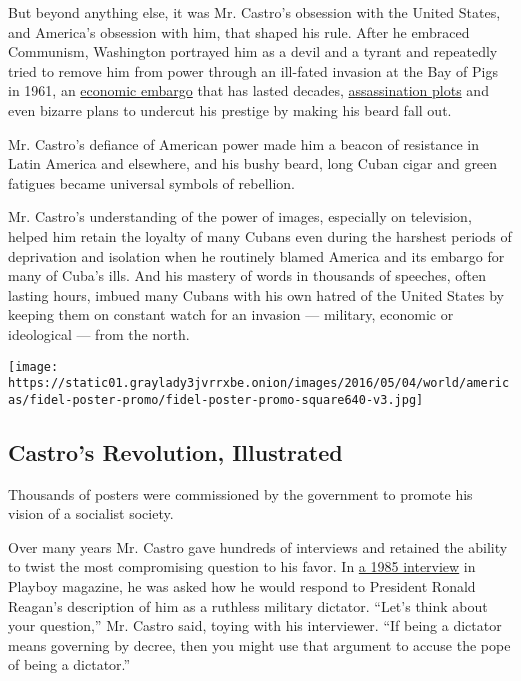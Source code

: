 But beyond anything else, it was Mr. Castro's obsession with the United
States, and America's obsession with him, that shaped his rule. After he
embraced Communism, Washington portrayed him as a devil and a tyrant and
repeatedly tried to remove him from power through an ill-fated invasion
at the Bay of Pigs in 1961, an
\href{http://www.treasury.gov/resource-center/sanctions/Programs/Pages/cuba.aspx}{economic
embargo} that has lasted decades,
\href{http://washington.blogs.nytimes3xbfgragh.onion/2007/06/26/a-plot-to-assassinate-castro-was-approved-by-cia-director-allen-dulles/}{assassination
plots} and even bizarre plans to undercut his prestige by making his
beard fall out.

Mr. Castro's defiance of American power made him a beacon of resistance
in Latin America and elsewhere, and his bushy beard, long Cuban cigar
and green fatigues became universal symbols of rebellion.

Mr. Castro's understanding of the power of images, especially on
television, helped him retain the loyalty of many Cubans even during the
harshest periods of deprivation and isolation when he routinely blamed
America and its embargo for many of Cuba's ills. And his mastery of
words in thousands of speeches, often lasting hours, imbued many Cubans
with his own hatred of the United States by keeping them on constant
watch for an invasion --- military, economic or ideological --- from the
north.

\href{https://www.nytimes3xbfgragh.onion/interactive/2016/11/26/world/americas/fidel-castro-cuban-posters.html}{}

\texttt{[image: https://static01.graylady3jvrrxbe.onion/images/2016/05/04/world/americas/fidel-poster-promo/fidel-poster-promo-square640-v3.jpg]}

\hypertarget{castros-revolution-illustrated}{%
\subsection{Castro's Revolution,
Illustrated}\label{castros-revolution-illustrated}}

Thousands of posters were commissioned by the government to promote his
vision of a socialist society.

Over many years Mr. Castro gave hundreds of interviews and retained the
ability to twist the most compromising question to his favor. In
\href{http://www.playboy.com/articles/50-years-of-the-playboy-interview-fidel-castro}{a
1985 interview} in Playboy magazine, he was asked how he would respond
to President Ronald Reagan's description of him as a ruthless military
dictator. ``Let's think about your question,'' Mr. Castro said, toying
with his interviewer. ``If being a dictator means governing by decree,
then you might use that argument to accuse the pope of being a
dictator.''

